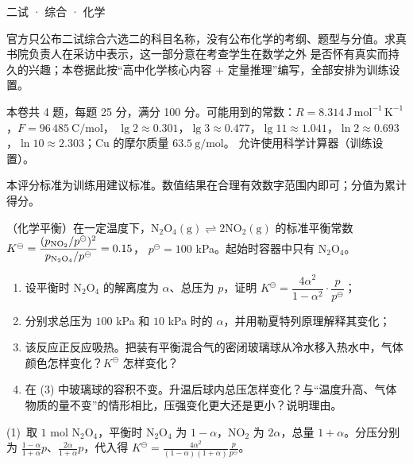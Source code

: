 \documentclass[cjk=noto, seal=first]{mojing-exam}
\begin{document}
\begin{paper}[time={建议 1.5 小时（训练设置）}, full=100]{二试 · 综合 · 化学}

\begin{instructions}
  \item 官方只公布二试综合六选二的科目名称，没有公布化学的考纲、题型与分值。求真书院负责人在采访中表示，这一部分意在考查学生在数学之外
        是否怀有真实而持久的兴趣；本卷据此按“高中化学核心内容 + 定量推理”编写，全部安排为训练设置。
  \item 本卷共 4 题，每题 25 分，满分 100 分。可能用到的常数：$R=8.314\ \mathrm{J\,mol^{-1}\,K^{-1}}$，$F=96\,485\ \mathrm{C/mol}$，
        $\lg2\approx0.301$，$\lg3\approx0.477$，$\lg11\approx1.041$，$\ln2\approx0.693$，$\ln10\approx2.303$；Cu 的摩尔质量 $63.5\ \mathrm{g/mol}$。
        允许使用科学计算器（训练设置）。
\end{instructions}

\begin{gradingnotes}
  \item 本评分标准为训练用建议标准。数值结果在合理有效数字范围内即可；分值为累计得分。
\end{gradingnotes}


\begin{questions}

\question[25]
（化学平衡）在一定温度下，$\mathrm{N_2O_4(g)\rightleftharpoons2NO_2(g)}$ 的标准平衡常数 $K^\ominus=\dfrac{(p_{\rm NO_2}/p^\ominus)^2}{p_{\rm N_2O_4}/p^\ominus}=0.15$，
$p^\ominus=100$ kPa。起始时容器中只有 $\mathrm{N_2O_4}$。
\begin{enumerate}
  \item 设平衡时 $\mathrm{N_2O_4}$ 的解离度为 $\alpha$、总压为 $p$，证明 $K^\ominus=\dfrac{4\alpha^2}{1-\alpha^2}\cdot\dfrac{p}{p^\ominus}$；
  \item 分别求总压为 $100$ kPa 和 $10$ kPa 时的 $\alpha$，并用勒夏特列原理解释其变化；
  \item 该反应正反应吸热。把装有平衡混合气的密闭玻璃球从冷水移入热水中，气体颜色怎样变化？$K^\ominus$ 怎样变化？
  \item 在 (3) 中玻璃球的容积不变。升温后球内总压怎样变化？与“温度升高、气体物质的量不变”的情形相比，压强变化更大还是更小？说明理由。
\end{enumerate}
\answerspace{2cm}
\begin{solution}
(1)~取 $1$ mol $\mathrm{N_2O_4}$，平衡时 $\mathrm{N_2O_4}$ 为 $1-\alpha$，$\mathrm{NO_2}$ 为 $2\alpha$，总量 $1+\alpha$。分压分别为
$\frac{1-\alpha}{1+\alpha}p$、$\frac{2\alpha}{1+\alpha}p$，代入得 $K^\ominus=\frac{4\alpha^2}{(1-\alpha)(1+\alpha)}\frac p{p^\ominus}$。


\end{solution}
\end{questions}
\end{paper}
\end{document}
